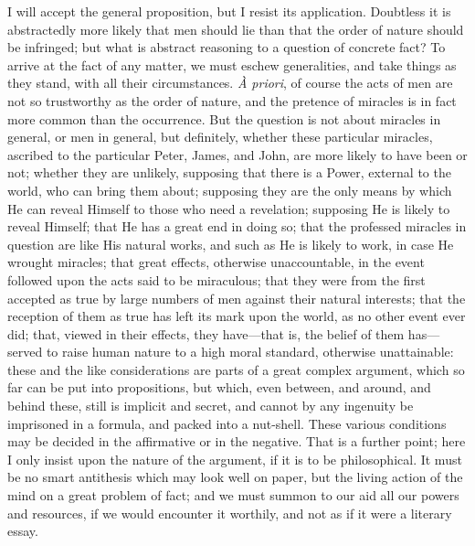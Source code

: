 I will accept the general proposition, but I resist its
application. Doubtless it is abstractedly more likely that men should
lie than that the order of nature should be infringed; but what is
abstract reasoning to a question of concrete fact? To arrive at the
fact of any matter, we must eschew generalities, and take things as
they stand, with all their circumstances. \emph{À priori}, of course
the acts of men are not so trustworthy as the order of nature, and the
pretence of miracles is in fact more common than the occurrence. But
the question is not about miracles in general, or men in general, but
definitely, whether these particular miracles, ascribed to the
particular Peter, James, and John, are more likely to have been or
not; whether they are unlikely, supposing that there is a Power,
external to the world, who can bring them about; supposing they
are the only means by which He can reveal Himself to those who need a
revelation; supposing He is likely to reveal Himself; that He has a
great end in doing so; that the professed miracles in question are
like His natural works, and such as He is likely to work, in case He
wrought miracles; that great effects, otherwise unaccountable, in the
event followed upon the acts said to be miraculous; that they were
from the first accepted as true by large numbers of men against their
natural interests; that the reception of them as true has left its
mark upon the world, as no other event ever did; that, viewed in their
effects, they have—that is, the belief of them has—served to raise
human nature to a high moral standard, otherwise unattainable: these
and the like considerations are parts of a great complex argument,
which so far can be put into propositions, but which, even between,
and around, and behind these, still is implicit and secret, and cannot
by any ingenuity be imprisoned in a formula, and packed into a
nut-shell. These various conditions may be decided in the affirmative
or in the negative. That is a further point; here I only insist upon
the nature of the argument, if it is to be philosophical. It must be
no smart antithesis which may look well on paper, but the living
action of the mind on a great problem of fact; and we must summon to
our aid all our powers and resources, if we would encounter it
worthily, and not as if it were a literary essay.

